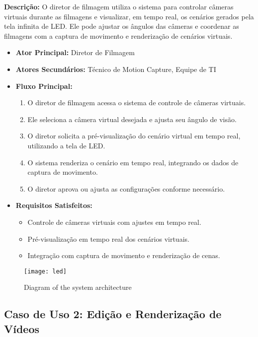 \textbf{Descrição:} O diretor de filmagem utiliza o sistema para controlar câmeras virtuais durante as filmagens e visualizar, em tempo real, os cenários gerados pela tela infinita de LED. Ele pode ajustar os ângulos das câmeras e coordenar as filmagens com a captura de movimento e renderização de cenários virtuais.

\begin{itemize}
  \item \textbf{Ator Principal:} Diretor de Filmagem
  \item \textbf{Atores Secundários:} Técnico de Motion Capture, Equipe de TI
  \item \textbf{Fluxo Principal:}
    \begin{enumerate}
      \item O diretor de filmagem acessa o sistema de controle de câmeras virtuais.
      \item Ele seleciona a câmera virtual desejada e ajusta seu ângulo de visão.
      \item O diretor solicita a pré-visualização do cenário virtual em tempo real, utilizando a tela de LED.
      \item O sistema renderiza o cenário em tempo real, integrando os dados de captura de movimento.
      \item O diretor aprova ou ajusta as configurações conforme necessário.
    \end{enumerate}
  \item \textbf{Requisitos Satisfeitos:}
    \begin{itemize}
      \item Controle de câmeras virtuais com ajustes em tempo real.
      \item Pré-visualização em tempo real dos cenários virtuais.
      \item Integração com captura de movimento e renderização de cenas.
    \end{itemize}
\end{itemize}

\begin{figure}[ht]
    \centering
    \texttt{[image: led]}
    \caption{Diagram of the system architecture}
    \label{fig:diagram1}
\end{figure}

\subsection{Caso de Uso 2: Edição e Renderização de Vídeos}

